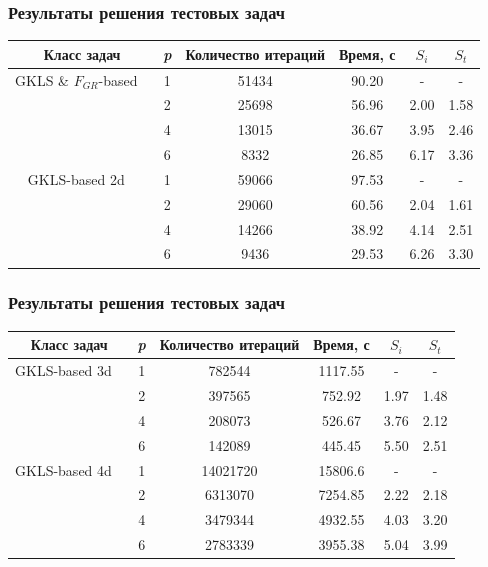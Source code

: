 \documentclass[aspectratio=1610]{beamer}
\begin{document}
\begin{frame}
  \frametitle{Результаты решения тестовых задач}
  \begin{table}
    \centering
    \begin{tabular}{c|c|c|c|c|c}
      Класс задач & \textit{p} & Количество итераций & Время, с & \(S_i\) & \(S_t\)   \\
      \hline
      GKLS \& \(F_{GR}\)-based \
        & 1 & 51434 & 90.20 & -    & - \\
        & 2 & 25698 & 56.96 & 2.00 & 1.58 \\
        & 4 & 13015 & 36.67 & 3.95 & 2.46 \\
        & 6 & 8332  & 26.85 & 6.17 & 3.36 \\
      \hline
      GKLS-based 2d \
        & 1 & 59066 & 97.53 & -    & - \\
        & 2 & 29060 & 60.56 & 2.04 & 1.61 \\
        & 4 & 14266 & 38.92 & 4.14 & 2.51 \\
        & 6 & 9436  & 29.53 & 6.26 & 3.30 \\
      \hline
    \end{tabular}
  \end{table}
\end{frame}
\begin{frame}
  \frametitle{Результаты решения тестовых задач}
  \begin{table}
    \centering
    \begin{tabular}{c|c|c|c|c|c}
      Класс задач & \textit{p} & Количество итераций & Время, с & \(S_i\) & \(S_t\)   \\
      \hline
      GKLS-based 3d \
        & 1 & 782544 & 1117.55 & -    & - \\
        & 2 & 397565 & 752.92  & 1.97 & 1.48 \\
        & 4 & 208073 & 526.67  & 3.76 & 2.12 \\
        & 6 & 142089 & 445.45  & 5.50 & 2.51 \\
      \hline
      GKLS-based 4d \
        & 1 & 14021720 & 15806.6 & -    & - \\
        & 2 & 6313070 & 7254.85  & 2.22 & 2.18 \\
        & 4 & 3479344 & 4932.55  & 4.03 & 3.20 \\
        & 6 & 2783339 & 3955.38  & 5.04 & 3.99 \\
      \hline
    \end{tabular}
  \end{table}
\end{frame}
\end{document}
